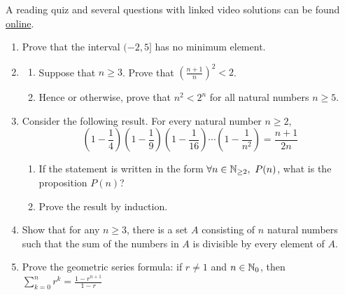 \begin{exercises}
	A reading quiz and several questions with linked video solutions can be found \href{http://www.math.uci.edu/~ndonalds/math13/selftest/5-2-wellorder.html}{online}.

	\begin{enumerate}
  	\item Prove that the interval $(-2,5]$ has no minimum element.
  
  	\item\begin{enumerate}
    	\item Suppose that $n\ge 3$. Prove that $\left(\frac{n+1}n\right)^2<2$.
    	\item Hence or otherwise, prove that $n^2<2^n$ for all natural numbers $n\ge 5$.
  	\end{enumerate}
  	
  	


	  \item Consider the following result. For every natural number $n\ge 2$,
		\[
			\left(1-\frac{1}{4}\right) \left(1-\frac{1}{9}\right) \left(1-\frac{1}{16}\right) \cdots \left(1-\frac{1}{n^2}\right) = \frac{n+1}{2n}
		\]
	  \begin{enumerate}
	    \item If the statement is written in the form $\forall n\in\mathbb{N}_{\ge 2},\ P(n)$, what is the proposition $P(n)$?
	    \item Prove the result by induction.
	  \end{enumerate}
	
	
  	\item Show that for any $n \geq 3$, there is a set $A$ consisting of $n$ natural numbers such that the sum of the numbers in $A$ is divisible by every element of $A$.
  
	
		\item Prove the geometric series formula: if $r\neq 1$ and $n\in\mathbb{N}_0$, then
			$\sum\limits_{k=0}^nr^k=\frac{1-r^{n+1}}{1-r}$
		

\end{enumerate}
\end{exercises}
